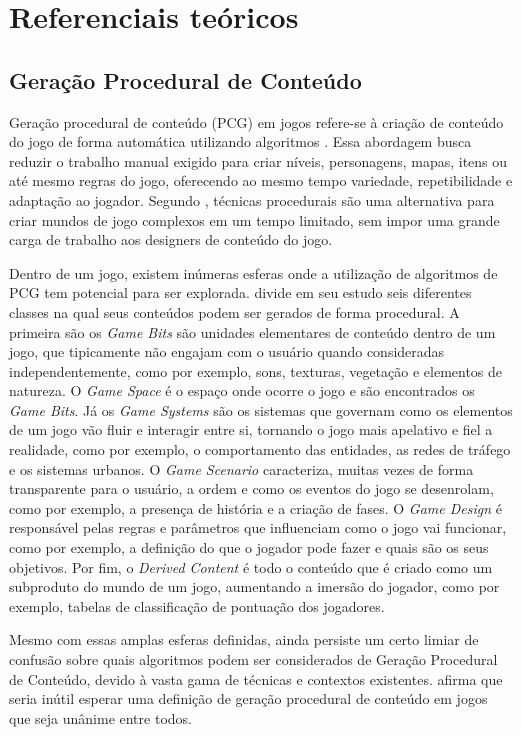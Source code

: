 \chapter{Referenciais teóricos}

\section{Geração Procedural de Conteúdo}
Geração procedural de conteúdo (PCG) em jogos refere-se à criação de conteúdo do jogo de forma automática
utilizando algoritmos \cite{Togelius}. Essa abordagem busca reduzir o trabalho manual exigido para criar 
níveis, personagens, mapas, itens ou até mesmo regras do jogo, oferecendo ao mesmo tempo variedade, 
repetibilidade e adaptação ao jogador. Segundo , técnicas procedurais são uma alternativa para 
criar mundos de jogo complexos em um tempo limitado, sem impor uma grande carga de trabalho aos designers de conteúdo do jogo.

Dentro de um jogo, existem inúmeras esferas onde a utilização de algoritmos de PCG tem potencial para ser explorada. 
 divide em seu estudo seis diferentes classes na qual seus conteúdos podem ser gerados de forma procedural. 
A primeira são os \textit{Game Bits} são unidades elementares de conteúdo dentro de um jogo, que tipicamente não engajam com o usuário 
quando consideradas independentemente, como por exemplo, sons, texturas, vegetação e elementos de natureza. O \textit{Game Space} é o 
espaço onde ocorre o jogo e são encontrados os \textit{Game Bits}. Já os \textit{Game Systems} são os sistemas que governam como os elementos 
de um jogo vão fluir e interagir entre si, tornando o jogo mais apelativo e fiel a realidade, como por exemplo, o comportamento 
das entidades, as redes de tráfego e os sistemas urbanos. O \textit{Game Scenario} caracteriza, muitas vezes de forma transparente 
para o usuário, a ordem e como os eventos do jogo se desenrolam, como por exemplo, a presença de história e a criação de fases.
O \textit{Game Design} é responsável pelas regras e parâmetros que influenciam como o jogo vai funcionar, como por exemplo, a definição 
do que o jogador pode fazer e quais são os seus objetivos. Por fim, o \textit{Derived Content} é todo o conteúdo que é criado como um 
subproduto do mundo de um jogo, aumentando a imersão do jogador, como por exemplo, tabelas de classificação de pontuação dos jogadores.


Mesmo com essas amplas esferas definidas, ainda persiste um certo limiar de confusão sobre quais algoritmos podem ser
considerados de Geração Procedural de Conteúdo, devido à vasta gama de técnicas e contextos existentes. 
 afirma que seria inútil esperar uma definição de geração procedural de conteúdo em jogos 
que seja unânime entre todos. 

